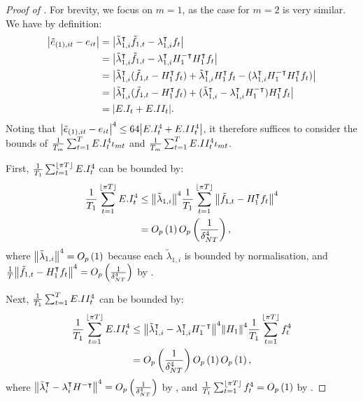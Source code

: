 \documentclass[12pt]{article}
\newcommand*{\tran}{\intercal}
\theoremstyle{plain}
\numberwithin{equation}{section}
\begin{document}
\begin{proof}[Proof of ]
For brevity, we focus on $m = 1$, as the case for $m = 2$ is very similar. We have by definition:
\begin{align*}
\abs{\tilde{e}_{(1), it} - e_{it}} 
&= \abs{\tilde{\lambda}_{1, i}^\tran \tilde{f}_{1, t} - \lambda_{1, i}^\tran f_t} \\
&= \abs{
	\tilde{\lambda}_{1, i}^\tran \tilde{f}_{1, t} - \lambda_{1, i}^\tran H_1^{-\tran} H_1^\tran f_t
} \\
&= \abs{
	\tilde{\lambda}_{1, i}^\tran (\tilde{f}_{1, t} - H_1^\tran f_t) + \tilde{\lambda}_{1, i}^\tran H_1^\tran f_t - (\lambda_{1, i}^\tran H_1^{-\tran} H_1^\tran f_t)
} \\
&= \abs{
	\tilde{\lambda}_{1, i}^\tran (\tilde{f}_{1, t} - H_1^\tran f_t) + (\tilde{\lambda}_{1, i}^\tran - \lambda_{1, i}^\tran H_1^{- \tran}) H_1^\tran f_t
} \\ 
&=
\abs{E.I_t + E.II_t}.
\end{align*}
Noting that $\abs{\tilde{e}_{(1), it} - e_{it}}^4 \leq 64\abs{E.I_t^4 + E.II_t^4}$, it therefore suffices to consider the bounds of $\frac{1}{T_m} \sum_{t = 1}^{T} E.I_t^4 \iota_{mt}$ and $\frac{1}{T_m} \sum_{t = 1}^{T} E.II_t^4 \iota_{mt}$. 

First, $\frac{1}{T_1} \sum_{t = 1}^{\left \lfloor \pi T \right \rfloor} E.I_t^4$ can be bounded by:
\begin{align*}
\frac{1}{T_1} \sumTfloor E.I_t^4 &\leq 
\norm{\tilde{\lambda}_{1, i}}^4 \frac{1}{T_1} \sumTfloor \norm{\tilde{f}_{1, t} - H_1^\tran f_{t}}^4 \\
&= \Op{1} \Opdeltaquart, 
\end{align*}
where $\norm{\tilde{\lambda}_{1, i}}^4 = O_p \left( 1 \right)$ because each $\tilde{\lambda}_{1, i}$ is bounded by normalisation, and $\frac{1}{T} \norm{\tilde{f}_{1, t} - H_1^\tran f_t}^4 = \Opdeltaquart$ by . 

Next, $\frac{1}{T_1} \sum_{t = 1}^{T} E.II_t^4$ can be bounded by:
\begin{align*}
\fracTone \sumTfloor E.II_t^4 &\leq 
\norm{\tilde{\lambda}_{1, i}^\tran - \lambda_{1, i}^\tran H_1^{- \tran}}^4 
\norm{H_1}^4 \fracTone \sumTfloor f_t^4 \\
&= \Opdeltaquart \Op{1} \Op{1},
\end{align*}
where $\norm{\tilde{\lambda}_i^\tran - \lambda_i^\tran H^{- \tran}}^4 = \Opdeltaquart$ by , and $\frac{1}{T_1} \sum_{t = 1}^{\left \lfloor \pi T \right \rfloor} f_t^4 = O_p \left( 1 \right)$ by .
\end{proof}
\end{document}
